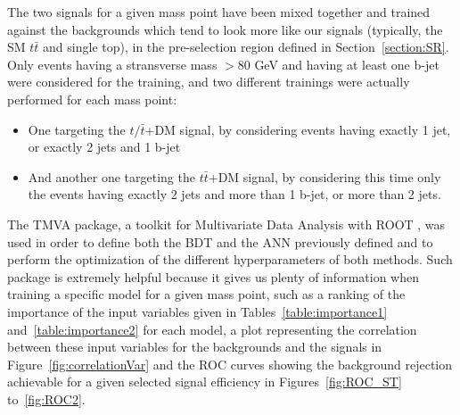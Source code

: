 \documentclass[a4paper, 10pt, openright]{report}
\begin{document}
The two signals for a given mass point have been mixed together and trained against the backgrounds which tend to look more like our signals (typically, the \ac{SM} $t \bar t$ and single top), in the pre-selection region defined in Section~\ref{section:SR}. Only events having a stransverse mass $> 80$ GeV and having at least one b-jet were considered for the training, and two different trainings were actually performed for each mass point:
\begin{itemize}
\item One targeting the $t/\bar t$+DM signal, by considering events having exactly 1 jet, or exactly 2 jets and 1 b-jet
\item And another one targeting the $t \bar t$+DM signal, by considering this time only the events having exactly 2 jets and more than 1 b-jet, or more than 2 jets.
\end{itemize}

The TMVA package, a toolkit for Multivariate Data Analysis with ROOT \cite{TMVA}, was used in order to define both the \ac{BDT} and the \ac{ANN} previously defined and to perform the optimization of the different hyperparameters of both methods. Such package is extremely helpful because it gives us plenty of information when training a specific model for a given mass point, such as a ranking of the importance of the input variables given in Tables~\ref{table:importance1} and~\ref{table:importance2} for each model, a plot representing the correlation between these input variables for the backgrounds and the signals in Figure~\ref{fig:correlationVar} and the \ac{ROC} curves showing the background rejection achievable for a given selected signal efficiency in Figures~\ref{fig:ROC_ST} to~\ref{fig:ROC2}. 
\end{document}
